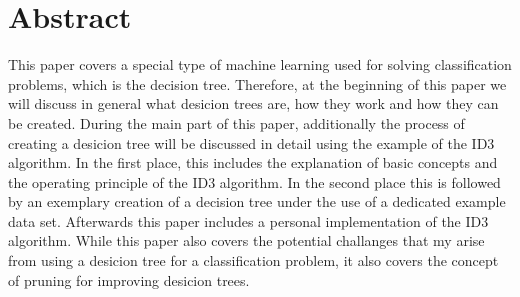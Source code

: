 \chapter{Abstract}
\label{abstract}

This paper covers a special type of machine learning used for solving classification problems, which is the decision tree. Therefore, at the beginning of this paper we will discuss in general what desicion trees are, how they work and how they can be created. During the main part of this paper, additionally the process of creating a desicion tree will be discussed in detail using the example of the ID3 algorithm. In the first place, this includes the explanation of basic concepts and the operating principle of the ID3 algorithm. In the second place this is followed by an exemplary creation of a decision tree under the use of a dedicated example data set. Afterwards this paper includes a personal implementation of the ID3 algorithm. While this paper also covers the potential challanges that my arise from using a desicion tree for a classification problem, it also covers the concept of pruning for improving desicion trees.